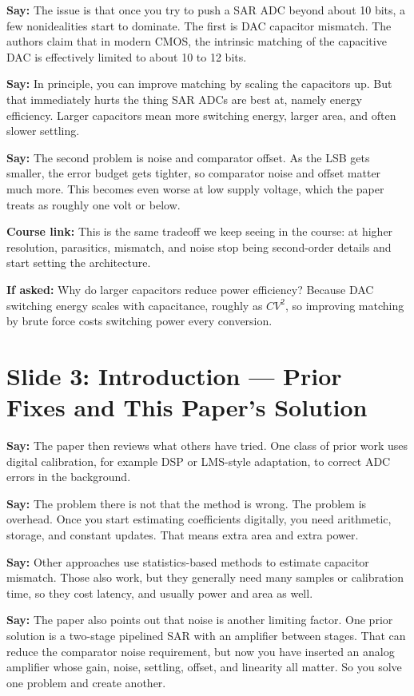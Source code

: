 \documentclass[11pt]{article}
\newcommand{\speak}[1]{\textbf{Say:} #1}
\newcommand{\ifasked}[1]{\textbf{If asked:} #1}
\newcommand{\course}[1]{\textbf{Course link:} #1}
\begin{document}
\speak{The issue is that once you try to push a SAR ADC beyond about 10 bits, a few nonidealities start to dominate. The first is DAC capacitor mismatch. The authors claim that in modern CMOS, the intrinsic matching of the capacitive DAC is effectively limited to about 10 to 12 bits.}

\speak{In principle, you can improve matching by scaling the capacitors up. But that immediately hurts the thing SAR ADCs are best at, namely energy efficiency. Larger capacitors mean more switching energy, larger area, and often slower settling.}

\speak{The second problem is noise and comparator offset. As the LSB gets smaller, the error budget gets tighter, so comparator noise and offset matter much more. This becomes even worse at low supply voltage, which the paper treats as roughly one volt or below.}

\course{This is the same tradeoff we keep seeing in the course: at higher resolution, parasitics, mismatch, and noise stop being second-order details and start setting the architecture.}

\ifasked{Why do larger capacitors reduce power efficiency? Because DAC switching energy scales with capacitance, roughly as $CV^2$, so improving matching by brute force costs switching power every conversion.}

\section*{Slide 3: Introduction --- Prior Fixes and This Paper's Solution}
\speak{The paper then reviews what others have tried. One class of prior work uses digital calibration, for example DSP or LMS-style adaptation, to correct ADC errors in the background.}

\speak{The problem there is not that the method is wrong. The problem is overhead. Once you start estimating coefficients digitally, you need arithmetic, storage, and constant updates. That means extra area and extra power.}

\speak{Other approaches use statistics-based methods to estimate capacitor mismatch. Those also work, but they generally need many samples or calibration time, so they cost latency, and usually power and area as well.}

\speak{The paper also points out that noise is another limiting factor. One prior solution is a two-stage pipelined SAR with an amplifier between stages. That can reduce the comparator noise requirement, but now you have inserted an analog amplifier whose gain, noise, settling, offset, and linearity all matter. So you solve one problem and create another.}
\end{document}
